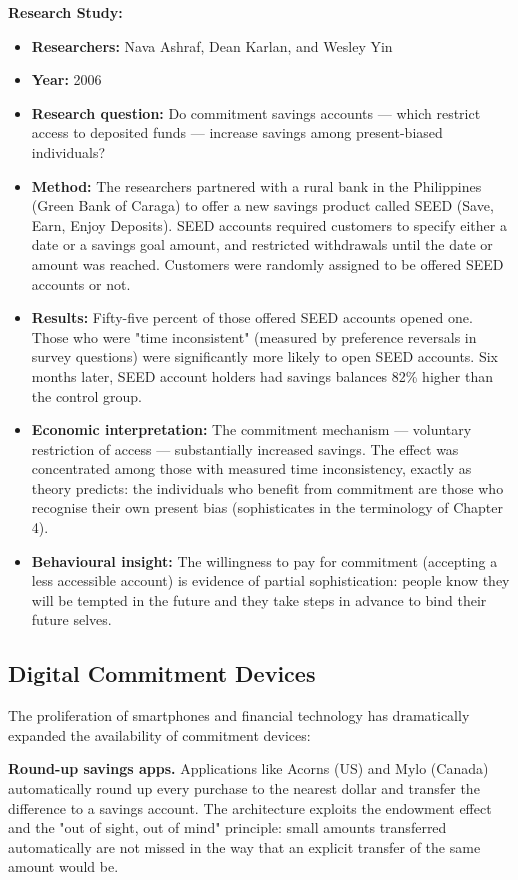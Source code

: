 \documentclass[12pt, letterpaper]{article}
\begin{document}
\textbf{Research Study:}
\begin{itemize}
\item \textbf{Researchers:} Nava Ashraf, Dean Karlan, and Wesley Yin
\item \textbf{Year:} 2006
\item \textbf{Research question:} Do commitment savings accounts --- which restrict access to deposited funds --- increase savings among present-biased individuals?
\item \textbf{Method:} The researchers partnered with a rural bank in the Philippines (Green Bank of Caraga) to offer a new savings product called SEED (Save, Earn, Enjoy Deposits). SEED accounts required customers to specify either a date or a savings goal amount, and restricted withdrawals until the date or amount was reached. Customers were randomly assigned to be offered SEED accounts or not.
\item \textbf{Results:} Fifty-five percent of those offered SEED accounts opened one. Those who were "time inconsistent" (measured by preference reversals in survey questions) were significantly more likely to open SEED accounts. Six months later, SEED account holders had savings balances 82\% higher than the control group.
\item \textbf{Economic interpretation:} The commitment mechanism --- voluntary restriction of access --- substantially increased savings. The effect was concentrated among those with measured time inconsistency, exactly as theory predicts: the individuals who benefit from commitment are those who recognise their own present bias (sophisticates in the terminology of Chapter 4).
\item \textbf{Behavioural insight:} The willingness to pay for commitment (accepting a less accessible account) is evidence of partial sophistication: people know they will be tempted in the future and they take steps in advance to bind their future selves.
\end{itemize}


\subsection{Digital Commitment Devices}


The proliferation of smartphones and financial technology has dramatically expanded the availability of commitment devices:

\textbf{Round-up savings apps.} Applications like Acorns (US) and Mylo (Canada) automatically round up every purchase to the nearest dollar and transfer the difference to a savings account. The architecture exploits the endowment effect and the "out of sight, out of mind" principle: small amounts transferred automatically are not missed in the way that an explicit transfer of the same amount would be.
\end{document}
